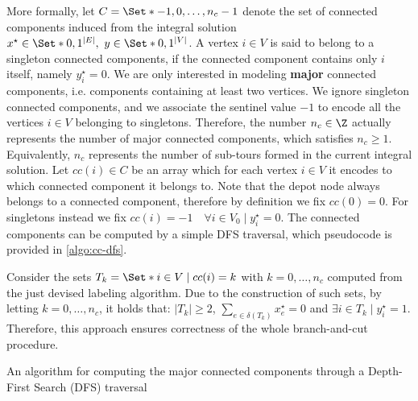 More formally,
let $C = \Set*{-1, 0, \dots, n_c - 1}$ denote the set of connected components
induced from the integral solution $x^\star \in \Set*{0, 1}^{|E|},\ y \in \Set*{0, 1}^{|V|}$.
A vertex $i \in V$ is said to belong to a singleton connected components,
if the connected component contains only $i$ itself, namely $y^\star_i = 0$.
We are only interested in modeling \textbf{major} connected components,
i.e. components containing at least two vertices.
We ignore singleton connected components,
and we associate the sentinel value $-1$ to encode all the vertices $i \in V$ belonging to singletons.
Therefore, the number $n_c \in \Z$ actually represents the number
of major connected components, which satisfies $n_c \ge 1$.
Equivalently,
$n_c$ represents the number of sub-tours formed in the current integral solution.
Let $cc(i) \in C$ be an array
which for each vertex $i \in V$ it encodes to which connected component it belongs to.
Note that the depot node always belongs to a connected component,
therefore by definition we fix $cc(0) = 0$.
For singletons instead we fix $cc(i) = -1  \quad \forall i \in V_0 \mid y^\star_i = 0$.
The connected components can be computed
by a simple DFS traversal, which pseudocode is provided in \cref{algo:cc-dfs}.

Consider the sets $T_k = \Set*{i \in V \mid cc(i) = k}$ with $k = 0, \dots, n_c$
computed from the just devised labeling algorithm.
Due to the construction of such sets,
by letting $k = 0, \dots, n_c$,
it holds that:
$|T_k| \ge 2$,
$\sum_{e \in \delta(T_k)} x^\star_e = 0$
and $\exists i \in T_k \mid y^\star_i = 1$.
Therefore, this approach ensures correctness of the whole branch-and-cut procedure.

\begin{algorithm}
	\caption{An algorithm for computing the major connected components through a Depth-First Search (DFS) traversal}
	
	\label{algo:cc-dfs}
\end{algorithm}

